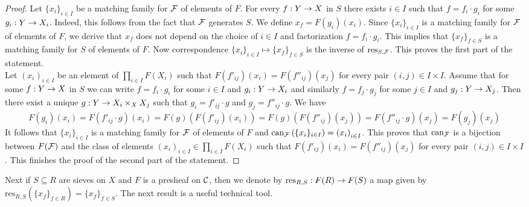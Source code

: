 \begin{proof}
Let $\{x_i\}_{i\in I}$ be a matching family for ${\mathcal F}$ of elements of $F$. For every $f:Y\rightarrow X$ in $S$ there exists $i\in I$ such that $f = f_i\cdot g_i$ for some $g_i:Y\rightarrow X_i$. Indeed, this follows from the fact that ${\mathcal F}$ generates $S$. We define $x_f = F(g_i)(x_i)$. Since $\{x_i\}_{i\in I}$ is a matching family for ${\mathcal F}$ of elements of $F$, we derive that $x_f$ does not depend on the choice of $i\in I$ and factorization $f = f_i\cdot g_i$. This implies that $\{x_f\}_{f\in S}$ is a matching family for $S$ of elements of $F$. Now correspondence $\{x_i\}_{i\in I}\mapsto \{x_f\}_{f\in S}$ is the inverse of $\mathrm{res}_{S,{\mathcal F}}$. This proves the first part of the statement.\\
Let $\left(x_i\right)_{i\in I}$ be an element of $\prod_{i\in I}F(X_i)$ such that $F(f'_{ij})(x_i)=F(f''_{ij})(x_j)$ for every pair $(i,j)\in I\times I$. Assume that for some $f:Y\rightarrow X$ in $S$ we can write $f = f_i\cdot g_i$ for some $i\in I$ and $g_i:Y\rightarrow X_i$ and similarly $f = f_j\cdot g_j$ for some $j\in I$ and $g_j:Y\rightarrow X_j$. Then there exist a unique $g:Y\rightarrow X_i\times_XX_j$ such that $g_i = f'_{ij}\cdot g$ and $g_j = f''_{ij}\cdot g$. We have
$$F(g_i)(x_i)=F(f'_{ij}\cdot g)(x_i)=F(g)\left(F(f'_{ij})(x_i)\right)=F(g)\left(F(f''_{ij})(x_j)\right)=F(f''_{ij}\cdot g)(x_j)=F(g_j)(x_j)$$
It follows that $\{x_i\}_{i\in I}$ is a matching family for ${\mathcal F}$ of elements of $F$ and $\mathrm{can}_{{\mathcal F}}\left(\{x_i\}_{i\in I}\right)=\left(x_i\right)_{i\in I}$. This proves that $\mathrm{can}_{{\mathcal F}}$ is a bijection between $F({\mathcal F})$ and the class of elements $\left(x_i\right)_{i\in I}\in \prod_{i\in I}F(X_i)$ such that $F(f'_{ij})(x_i)=F(f''_{ij})(x_j)$ for every pair $(i,j)\in I\times I$. This finishes the proof of the second part of the statement.
\end{proof}
\noindent
Next if $S\subseteq R$ are sieves on $X$ and $F$ is a presheaf on ${\mathcal C}$, then we denote by $\mathrm{res}_{R,S}:F(R)\rightarrow F(S)$ a map given by $\mathrm{res}_{R,S}(\{x_f\}_{f\in R}) = \{x_f\}_{f\in S}$. The next result is a useful technical tool.

